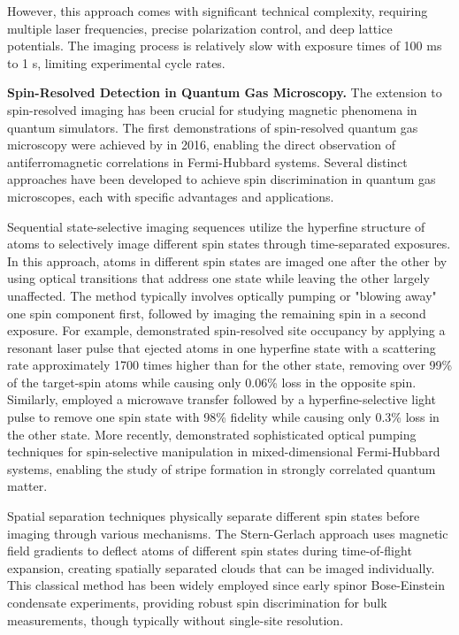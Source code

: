 However, this approach comes with significant technical complexity, requiring multiple laser frequencies, precise polarization control, and deep lattice potentials. The imaging process is relatively slow with exposure times of 100 ms to 1 s, limiting experimental cycle rates. 

\textbf{Spin-Resolved Detection in Quantum Gas Microscopy.} The extension to spin-resolved imaging has been crucial for studying magnetic phenomena in quantum simulators. The first demonstrations of spin-resolved quantum gas microscopy were achieved by \cite{boll_spin-_2016, parsons_site-resolved_2016} in 2016, enabling the direct observation of antiferromagnetic correlations in Fermi-Hubbard systems. Several distinct approaches have been developed to achieve spin discrimination in quantum gas microscopes, each with specific advantages and applications.

Sequential state-selective imaging sequences utilize the hyperfine structure of atoms to selectively image different spin states through time-separated exposures. In this approach, atoms in different spin states are imaged one after the other by using optical transitions that address one state while leaving the other largely unaffected. The method typically involves optically pumping or "blowing away" one spin component first, followed by imaging the remaining spin in a second exposure. For example, \cite{parsons_site-resolved_2016} demonstrated spin-resolved site occupancy by applying a resonant laser pulse that ejected atoms in one hyperfine state with a scattering rate approximately 1700 times higher than for the other state, removing over 99\% of the target-spin atoms while causing only 0.06\% loss in the opposite spin. Similarly, \cite{cheuk_quantum-gas_2015} employed a microwave transfer followed by a hyperfine-selective light pulse to remove one spin state with 98\% fidelity while causing only 0.3\% loss in the other state. More recently, \cite{bourgund_formation_2025} demonstrated sophisticated optical pumping techniques for spin-selective manipulation in mixed-dimensional Fermi-Hubbard systems, enabling the study of stripe formation in strongly correlated quantum matter.

Spatial separation techniques physically separate different spin states before imaging through various mechanisms. The Stern-Gerlach approach uses magnetic field gradients to deflect atoms of different spin states during time-of-flight expansion, creating spatially separated clouds that can be imaged individually. This classical method has been widely employed since early spinor Bose-Einstein condensate experiments, providing robust spin discrimination for bulk measurements, though typically without single-site resolution.

